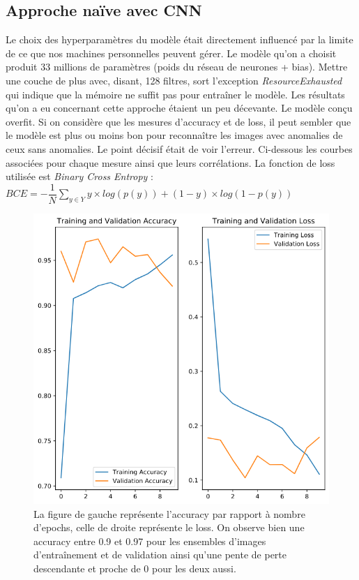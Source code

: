 \documentclass[french]{article}
\theoremstyle{mytheoremstyle}
\theoremstyle{mytheoremstyle}
\theoremstyle{myproblemstyle}
\begin{document}
    \subsection{Approche naïve avec CNN}
    Le choix des hyperparamètres du modèle était directement influencé par la limite de ce que nos machines personnelles peuvent gérer. Le modèle qu'on a choisit produit 33 millions de paramètres (poids du réseau de neurones + bias). Mettre une couche de plus avec, disant, 128 filtres, sort l'exception \textit{ResourceExhausted} qui indique que la mémoire ne suffit pas pour entraîner le modèle.
    \newline
    \indent Les résultats qu'on a eu concernant cette approche étaient un peu décevante. Le modèle conçu overfit. Si on considère que les mesures d'accuracy et de loss, il peut sembler que le modèle est plus ou moins bon pour reconnaître les images avec anomalies de ceux sans anomalies. Le point décisif était de voir l'erreur. Ci-dessous les courbes associées pour chaque mesure ainsi que leurs corrélations. La fonction de loss utilisée est \textit{Binary Cross Entropy} : $BCE = -\dfrac{1}{N} \sum\limits_{y \in Y} y \times log(p(y)) + (1-y) \times log(1-p(y))$
    \begin{figure}[H]
        \centering
        \includegraphics[width=.8\textwidth]{images/cnn_acc_loss.png}
        \caption{La figure de gauche représente l'accuracy par rapport à nombre d'epochs, celle de droite représente le loss. On observe bien une accuracy entre 0.9 et 0.97 pour les ensembles d'images d'entraînement et de validation ainsi qu'une pente de perte descendante et proche de 0 pour les deux aussi.}
        \label{}
    \end{figure}
\end{document}
